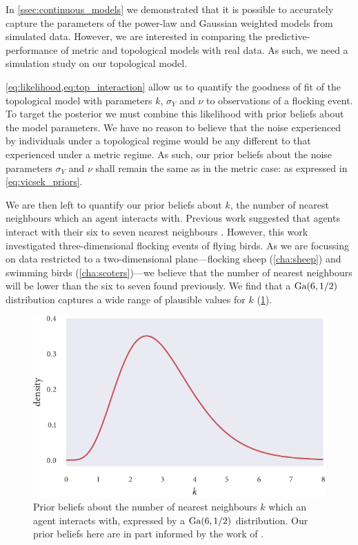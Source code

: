 In \cref{ssec:continuous_models} we demonstrated that it is possible to
accurately capture the parameters of the power-law and Gaussian weighted models
from simulated data. However, we are interested in comparing the
predictive-performance of metric and topological models with real data. As
such, we need a simulation study on our topological model.

\cref{eq:likelihood,eq:top_interaction} allow us to quantify the goodness of
fit of the topological model with parameters $k$, $\sigma_Y$ and $\nu$ to
observations of a flocking event. To target the posterior we must combine this
likelihood with prior beliefs about the model parameters. We have no reason to
believe that the noise experienced by individuals under a topological regime
would be any different to that experienced under a metric regime. As such, our
prior beliefs about the noise parameters $\sigma_Y$ and $\nu$ shall remain the
same as in the metric case: as expressed in \cref{eq:vicsek_priors}.

We are then left to quantify our prior beliefs about $k$, the number of nearest
neighbours which an agent interacts with. Previous work suggested that agents
interact with their six to seven nearest neighbours \parencite{ballerini08}.
However, this work investigated three-dimensional flocking events of flying
birds. As we are focussing on data restricted to a two-dimensional
plane---flocking sheep (\cref{cha:sheep}) and swimming birds
(\cref{cha:scoters})---we believe that the number of nearest neighbours will be
lower than the six to seven found previously. We find that a $\textrm{Ga}(6, 1/2)$
distribution captures a wide range of plausible values for $k$
(\cref{fig:top_priors}).

\begin{figure}[tbp]
  \includegraphics{top_priors.pdf}
  \caption{Prior beliefs about the number of nearest neighbours $k$ which an
    agent interacts with, expressed by a $\textrm{Ga}(6, 1/2)$ distribution. Our prior
    beliefs here are in part informed by the work of \textcite{ballerini08}.}
  \label{fig:top_priors}
\end{figure}

